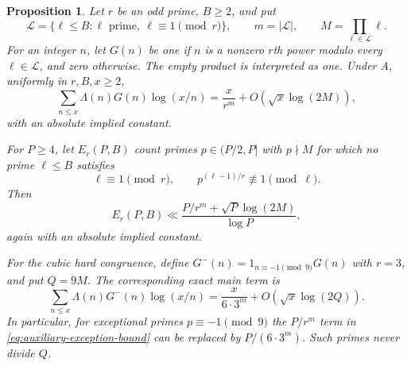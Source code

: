 \documentclass[11pt]{article}
\newtheorem{proposition}[theorem]{Proposition}
\theoremstyle{definition}
\theoremstyle{remark}
\begin{document}
\begin{proposition}\label{prop:auxiliary-character-sieve}
Let $r$ be an odd prime, $B\ge2$, and put
\[
 \mathcal L=\{\ell\le B:\ell\text{ prime},\ \ell\equiv1\pmod r\},
 \qquad m=|\mathcal L|,\qquad M=\prod_{\ell\in\mathcal L}\ell.
\]
For an integer $n$, let $G(n)$ be one if $n$ is a nonzero $r$th
power modulo every $\ell\in\mathcal L$, and zero otherwise.
The empty product is interpreted as one.  Under A, uniformly in
$r,B,x\ge2$,
\begin{equation}\label{eq:auxiliary-sieve-log-sum}
 \sum_{n\le x}\Lambda(n)G(n)\log(x/n)
 =\frac{x}{r^m}+O\!\left(\sqrt{x}\log(2M)\right),
\end{equation}
with an absolute implied constant.

For $P\ge4$, let $E_r(P,B)$ count primes $p\in(P/2,P]$ with
$p\nmid M$ for which no prime $\ell\le B$ satisfies
\[
 \ell\equiv1\pmod r,
 \qquad p^{(\ell-1)/r}\not\equiv1\pmod\ell.
\]
Then
\begin{equation}\label{eq:auxiliary-exception-bound}
 E_r(P,B)\ll
 \frac{P/r^m+\sqrt P\log(2M)}{\log P},
\end{equation}
again with an absolute implied constant.

For the cubic hard congruence, define
$G^-(n)=1_{n\equiv-1\pmod9}G(n)$ with $r=3$, and put $Q=9M$.
The corresponding exact main term is
\begin{equation}\label{eq:cubic-hard-sieve-log-sum}
 \sum_{n\le x}\Lambda(n)G^-(n)\log(x/n)
 =\frac{x}{6\cdot3^m}+O\!\left(\sqrt{x}\log(2Q)\right).
\end{equation}
In particular, for exceptional primes $p\equiv-1\pmod9$ the
$P/r^m$ term in \eqref{eq:auxiliary-exception-bound} can be replaced
by $P/(6\cdot3^m)$.  Such primes never divide $Q$.
\end{proposition}
\end{document}
